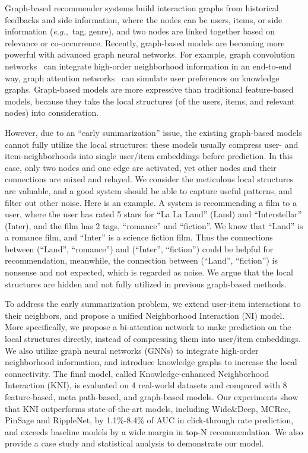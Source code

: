 \documentclass[sigconf]{acmart}
\newcommand{\new}[1]{{\color{black} #1}}
\newcommand{\eg}{\emph{e.g.},~}
\begin{document}
\new{Graph-based recommender systems build interaction graphs from historical feedbacks and side information, where the nodes can be users, items, or side information (\eg tag, genre), and two nodes are linked together based on relevance or co-occurrence. Recently, graph-based models are becoming more powerful with advanced graph neural networks. For example, graph convolution networks~\cite{van2017graph, ying2018graph} can integrate high-order neighborhood information in an end-to-end way, graph attention networks~\cite{wang2018ripplenet} can simulate user preferences on knowledge graphs.
Graph-based models are more expressive than traditional feature-based models, because they take the local structures (of the users, items, and relevant nodes) into consideration. 

However, due to an ``early summarization'' issue, the existing graph-based models cannot fully utilize the local structures:
these models usually compress user- and item-neighborhoods into single user/item embeddings before prediction. In this case, only two nodes and one edge are activated, yet other nodes and their connections are mixed and relayed. We consider the meticulous local structures are valuable, and a good system should be able to capture useful patterns, and filter out other noise. Here is an example. A system is recommending a film to a user, where the user has rated 5 stars for ``La La Land'' (Land) and ``Interstellar'' (Inter), and the film has 2 tags, ``romance'' and ``fiction''. We know that ``Land'' is a romance film, and ``Inter'' is a science fiction film. Thus the connections between (``Land'', ``romance'') and (``Inter'', ``fiction'') could be helpful for recommendation, meanwhile, the connection between (``Land'', ``fiction'') is nonsense and not expected, which is regarded as noise. We argue that the local structures are hidden and not fully utilized in previous graph-based methods.}

\new{To address the early summarization problem, we extend user-item interactions to their neighbors, and propose a unified Neighborhood Interaction (NI) model. More specifically, we propose a bi-attention network to make prediction on the local structures directly, instead of compressing them into user/item embeddings. We also utilize graph neural networks (GNNs) to integrate high-order neighborhood information, and introduce knowledge graphs to increase the local connectivity. The final model, called Knowledge-enhanced Neighborhood Interaction (KNI), is evaluated on 4 real-world datasets and compared with 8 feature-based, meta path-based, and graph-based models. Our experiments show that KNI outperforms state-of-the-art models, including Wide\&Deep, MCRec, PinSage and RippleNet, by 1.1\%-8.4\% of AUC in click-through rate prediction, and exceeds baseline models by a wide margin in top-N recommendation. We also provide a case study and statistical analysis to demonstrate our model.}
\end{document}
